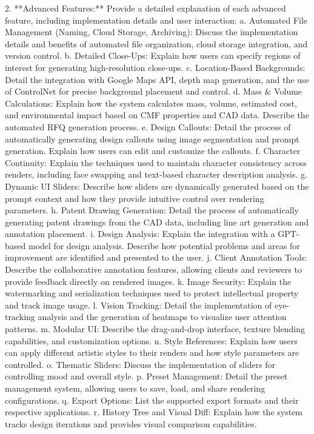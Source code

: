 \documentclass{article}
\begin{document}
      2.  **Advanced Features:**  Provide a detailed explanation of each advanced feature, including implementation details and user interaction:
         a. Automated File Management (Naming, Cloud Storage, Archiving): Discuss the implementation details and benefits of automated file organization, cloud storage integration, and version control.
         b. Detailed Close-Ups: Explain how users can specify regions of interest for generating high-resolution close-ups.
         c. Location-Based Backgrounds: Detail the integration with Google Maps API, depth map generation, and the use of ControlNet for precise background placement and control.
         d. Mass & Volume Calculations:  Explain how the system calculates mass, volume, estimated cost, and environmental impact based on CMF properties and CAD data.  Describe the automated RFQ generation process.
         e. Design Callouts: Detail the process of automatically generating design callouts using image segmentation and prompt generation.  Explain how users can edit and customize the callouts.
         f. Character Continuity:  Explain the techniques used to maintain character consistency across renders, including face swapping and text-based character description analysis.
         g. Dynamic UI Sliders: Describe how sliders are dynamically generated based on the prompt context and how they provide intuitive control over rendering parameters.
         h. Patent Drawing Generation: Detail the process of automatically generating patent drawings from the CAD data, including line art generation and annotation placement.
         i. Design Analysis:  Explain the integration with a GPT-based model for design analysis.  Describe how potential problems and areas for improvement are identified and presented to the user.
         j. Client Annotation Tools: Describe the collaborative annotation features, allowing clients and reviewers to provide feedback directly on rendered images.
         k. Image Security:  Explain the watermarking and serialization techniques used to protect intellectual property and track image usage.
         l. Vision Tracking: Detail the implementation of eye-tracking analysis and the generation of heatmaps to visualize user attention patterns.
         m. Modular UI:  Describe the drag-and-drop interface, texture blending capabilities, and customization options.
         n. Style References: Explain how users can apply different artistic styles to their renders and how style parameters are controlled.
         o. Thematic Sliders: Discuss the implementation of sliders for controlling mood and overall style.
         p. Preset Management: Detail the preset management system, allowing users to save, load, and share rendering configurations.
         q. Export Options:  List the supported export formats and their respective applications.
         r. History Tree and Visual Diff: Explain how the system tracks design iterations and provides visual comparison capabilities.
\end{document}

